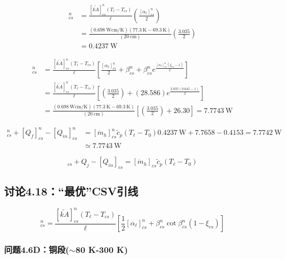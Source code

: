 \begin{align}%
[Q_\ell]_{cs}^{n}&=\frac{[\tilde{kA}]_{cs}^{n}(T_\ell-T_{cs})}{\ell}\left(\frac{[\alpha_\ell]_{cs}^{n}}{2}\right) \\
&=\frac{(0.698\ \mathrm{W cm/K})(77.3\ \mathrm{K}-69.3\ \mathrm{K})}{(20\ \mathrm{cm})}\left(\frac{3.035}{2}\right)\\
&=0.4237\ \mathrm{W}
\end{align}

\begin{align}%
[Q_j]_{cs}^{n}&=\frac{[\tilde{kA}]_{cs}^{n}(T_\ell-T_{cs})}{\ell}\left[\frac{[\alpha_\ell]_{cs}^{n}}{2}+\beta_{cs}^{n}+\beta_{cs}^{n}e^{\frac{[\alpha_\ell]_{cs}^{n}(\xi_{cs}-1)}{2}}\right] \\
&=\frac{[\tilde{kA}]_{cs}^{n}(T_\ell-T_{cs})}{\ell}\left[\left(\frac{3.035}{2}\right)+(28.586)e^{\frac{3.035(0.645-1)}{2}}\right] \\
&=\frac{(0.698\ \mathrm{W cm/K})(77.3\ \mathrm{K}-69.3\ \mathrm{K})}{(20\ \mathrm{cm})}\left[\left(\frac{3.035}{2}\right)+26.30\right]=7.7743\ \mathrm{W}
\end{align}

\begin{align}%
[Q_\ell]_{cs}^{n}+[Q_f]_{cs}^{n}-[Q_{in}]_{cs}^{n}&=[\dot{m}_h]_{cs}^{n}\tilde{c}_p(T_\ell-T_0)
0.4237\ \mathrm{W}+7.7658-0.4153=7.7742\ \mathrm{W} \\
&\simeq 7.7743\ \mathrm{W}             
\end{align}

\begin{equation}%
[Q_\ell]_{cs}+Q_j-[Q_{in}]_{cs}=[\dot{m}_h]_{cs}\tilde{c}_p(T_\ell-T_0)
\end{equation}


\subsection{讨论4.18：“最优”CSV引线}

\begin{equation}%
[Q_\ell]_{cs}^{n}=\frac{[\tilde{kA}]_{cs}^{n}(T_\ell-T_{cs})}{\ell}\left[\frac{1}{2}[\alpha_\ell]_{cs}^{n}+\beta_{cs}^{n}\cot\beta_{cs}^{n}(1-\xi_{cs})\right]
\end{equation}


\subsubsection{问题4.6D：铜段($\sim$80 K-300 K)}



